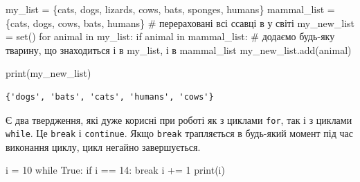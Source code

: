 \documentclass[
  letterpaper,
]{report}
\newenvironment{Shaded}{\begin{snugshade}}{\end{snugshade}}
\newcommand{\BuiltInTok}[1]{\textcolor[rgb]{0.00,0.23,0.31}{#1}}
\newcommand{\CommentTok}[1]{\textcolor[rgb]{0.37,0.37,0.37}{#1}}
\newcommand{\ControlFlowTok}[1]{\textcolor[rgb]{0.00,0.23,0.31}{#1}}
\newcommand{\DecValTok}[1]{\textcolor[rgb]{0.68,0.00,0.00}{#1}}
\newcommand{\KeywordTok}[1]{\textcolor[rgb]{0.00,0.23,0.31}{#1}}
\newcommand{\NormalTok}[1]{\textcolor[rgb]{0.00,0.23,0.31}{#1}}
\newcommand{\OperatorTok}[1]{\textcolor[rgb]{0.37,0.37,0.37}{#1}}
\newcommand{\StringTok}[1]{\textcolor[rgb]{0.13,0.47,0.30}{#1}}
\newcommand{\VariableTok}[1]{\textcolor[rgb]{0.07,0.07,0.07}{#1}}
\begin{document}
\begin{Shaded}
\begin{Highlighting}[]
\NormalTok{my\_list }\OperatorTok{=}\NormalTok{ \{}\StringTok{\textquotesingle{}cats\textquotesingle{}}\NormalTok{, }\StringTok{\textquotesingle{}dogs\textquotesingle{}}\NormalTok{, }\StringTok{\textquotesingle{}lizards\textquotesingle{}}\NormalTok{, }\StringTok{\textquotesingle{}cows\textquotesingle{}}\NormalTok{, }\StringTok{\textquotesingle{}bats\textquotesingle{}}\NormalTok{, }\StringTok{\textquotesingle{}sponges\textquotesingle{}}\NormalTok{, }\StringTok{\textquotesingle{}humans\textquotesingle{}}\NormalTok{\}}
\NormalTok{mammal\_list }\OperatorTok{=}\NormalTok{ \{}\StringTok{\textquotesingle{}cats\textquotesingle{}}\NormalTok{, }\StringTok{\textquotesingle{}dogs\textquotesingle{}}\NormalTok{, }\StringTok{\textquotesingle{}cows\textquotesingle{}}\NormalTok{, }\StringTok{\textquotesingle{}bats\textquotesingle{}}\NormalTok{, }\StringTok{\textquotesingle{}humans\textquotesingle{}}\NormalTok{\} }\CommentTok{\# перераховані всі ссавці в у світі}
\NormalTok{my\_new\_list }\OperatorTok{=} \BuiltInTok{set}\NormalTok{()}
\ControlFlowTok{for}\NormalTok{ animal }\KeywordTok{in}\NormalTok{ my\_list:}
    \ControlFlowTok{if}\NormalTok{ animal }\KeywordTok{in}\NormalTok{ mammal\_list:}
        \CommentTok{\# додаємо будь{-}яку тварину, що знаходиться і в my\_list, і в mammal\_list}
\NormalTok{        my\_new\_list.add(animal)}

\BuiltInTok{print}\NormalTok{(my\_new\_list)}
\end{Highlighting}
\end{Shaded}

\begin{verbatim}
{'dogs', 'bats', 'cats', 'humans', 'cows'}
\end{verbatim}

Є два твердження, які дуже корисні при роботі як з циклами \texttt{for},
так і з циклами \texttt{while}. Це \texttt{break} і \texttt{continue}.
Якщо \texttt{break} трапляється в будь-який момент під час виконання
циклу, цикл негайно завершується.

\begin{Shaded}
\begin{Highlighting}[]
\NormalTok{i }\OperatorTok{=} \DecValTok{10}
\ControlFlowTok{while} \VariableTok{True}\NormalTok{:}
    \ControlFlowTok{if}\NormalTok{ i }\OperatorTok{==} \DecValTok{14}\NormalTok{:}
        \ControlFlowTok{break}
\NormalTok{    i }\OperatorTok{+=} \DecValTok{1}
    \BuiltInTok{print}\NormalTok{(i)}
\end{Highlighting}
\end{Shaded}
\end{document}
